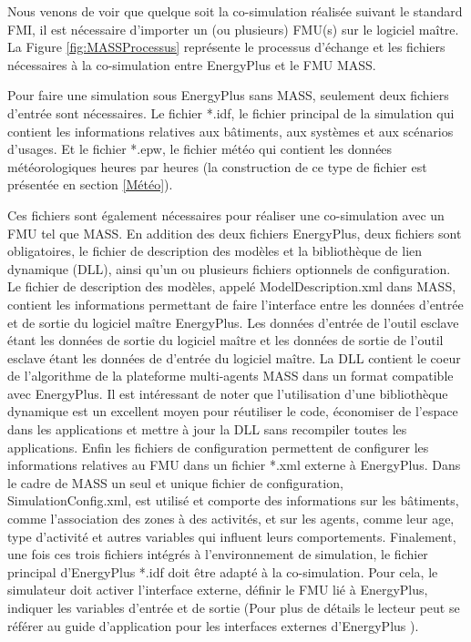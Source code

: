 Nous venons de voir que quelque soit la co-simulation réalisée suivant le standard FMI, il est nécessaire d'importer un (ou plusieurs) FMU(s) sur le logiciel maître. La Figure \ref{fig:MASSProcessus} représente le processus d'échange et les fichiers nécessaires à la co-simulation entre EnergyPlus et le FMU MASS.

Pour faire une simulation sous EnergyPlus sans MASS, seulement deux fichiers d'entrée sont nécessaires. Le fichier *.idf, le fichier principal de la simulation qui contient les informations relatives aux bâtiments, aux systèmes et aux scénarios d'usages. Et le fichier *.epw, le fichier météo qui contient les données météorologiques heures par heures (la construction de ce type de fichier est présentée en section \ref{Météo}).

Ces fichiers sont également nécessaires pour réaliser une co-simulation avec un FMU tel que MASS. En addition des deux fichiers EnergyPlus, deux fichiers sont obligatoires, le fichier de description des modèles et la bibliothèque de lien dynamique (DLL), ainsi qu'un ou plusieurs fichiers optionnels de configuration. Le fichier de description des modèles, appelé ModelDescription.xml dans MASS, contient les informations permettant de faire l'interface entre les données d'entrée et de sortie du logiciel maître EnergyPlus. Les données d'entrée de l'outil esclave étant les données de sortie du logiciel maître et les données de sortie de l'outil esclave étant les données de d'entrée du logiciel maître. La DLL contient le coeur de l'algorithme de la plateforme multi-agents MASS dans un format compatible avec EnergyPlus. Il est intéressant de noter que l'utilisation d'une bibliothèque dynamique est un excellent moyen pour réutiliser le code, économiser de l'espace dans les applications et mettre à jour la DLL sans recompiler toutes les applications. Enfin les fichiers de configuration permettent de configurer les informations relatives au FMU dans un fichier *.xml externe à EnergyPlus. Dans le cadre de MASS un seul et unique fichier de configuration, SimulationConfig.xml, est utilisé et comporte des informations sur les bâtiments, comme l'association des zones à des activités, et sur les agents, comme leur age, type d'activité et autres variables qui influent leurs comportements. Finalement, une fois ces trois fichiers intégrés à l'environnement de simulation, le fichier principal d'EnergyPlus *.idf doit être adapté à la co-simulation. Pour cela, le simulateur doit activer l'interface externe, définir le FMU lié à EnergyPlus, indiquer les variables d'entrée et de sortie (Pour plus de détails le lecteur peut se référer au guide d'application pour les interfaces externes d'EnergyPlus \cite{EP-ExternalInterface-16}).

